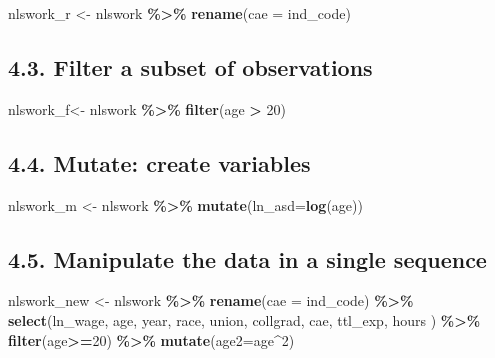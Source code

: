 \documentclass[
]{article}
\newenvironment{Shaded}{\begin{snugshade}}{\end{snugshade}}
\newcommand{\AttributeTok}[1]{\textcolor[rgb]{0.13,0.29,0.53}{#1}}
\newcommand{\DecValTok}[1]{\textcolor[rgb]{0.00,0.00,0.81}{#1}}
\newcommand{\FunctionTok}[1]{\textcolor[rgb]{0.13,0.29,0.53}{\textbf{#1}}}
\newcommand{\NormalTok}[1]{#1}
\newcommand{\OtherTok}[1]{\textcolor[rgb]{0.56,0.35,0.01}{#1}}
\newcommand{\SpecialCharTok}[1]{\textcolor[rgb]{0.81,0.36,0.00}{\textbf{#1}}}
\begin{document}
\begin{Shaded}
\begin{Highlighting}[]
\NormalTok{nlswork\_r }\OtherTok{\textless{}{-}}\NormalTok{ nlswork }\SpecialCharTok{\%\textgreater{}\%} 
  \FunctionTok{rename}\NormalTok{(}\AttributeTok{cae =}\NormalTok{ ind\_code)}
\end{Highlighting}
\end{Shaded}

\hypertarget{filter-a-subset-of-observations}{%
\subsection{4.3. Filter a subset of
observations}\label{filter-a-subset-of-observations}}

\begin{Shaded}
\begin{Highlighting}[]
\NormalTok{nlswork\_f}\OtherTok{\textless{}{-}}\NormalTok{ nlswork }\SpecialCharTok{\%\textgreater{}\%} 
  \FunctionTok{filter}\NormalTok{(age }\SpecialCharTok{\textgreater{}} \DecValTok{20}\NormalTok{) }
\end{Highlighting}
\end{Shaded}

\hypertarget{mutate-create-variables}{%
\subsection{4.4. Mutate: create
variables}\label{mutate-create-variables}}

\begin{Shaded}
\begin{Highlighting}[]
\NormalTok{ nlswork\_m }\OtherTok{\textless{}{-}}\NormalTok{ nlswork }\SpecialCharTok{\%\textgreater{}\%} 
  \FunctionTok{mutate}\NormalTok{(}\AttributeTok{ln\_asd=}\FunctionTok{log}\NormalTok{(age))}
\end{Highlighting}
\end{Shaded}

\hypertarget{manipulate-the-data-in-a-single-sequence}{%
\subsection{4.5. Manipulate the data in a single
sequence}\label{manipulate-the-data-in-a-single-sequence}}

\begin{Shaded}
\begin{Highlighting}[]
\NormalTok{nlswork\_new }\OtherTok{\textless{}{-}}\NormalTok{ nlswork }\SpecialCharTok{\%\textgreater{}\%} 
  \FunctionTok{rename}\NormalTok{(}\AttributeTok{cae =}\NormalTok{ ind\_code) }\SpecialCharTok{\%\textgreater{}\%}
  \FunctionTok{select}\NormalTok{(ln\_wage, age, year, race, union, collgrad, cae, ttl\_exp, hours ) }\SpecialCharTok{\%\textgreater{}\%} 
  \FunctionTok{filter}\NormalTok{(age}\SpecialCharTok{\textgreater{}=}\DecValTok{20}\NormalTok{) }\SpecialCharTok{\%\textgreater{}\%}
  \FunctionTok{mutate}\NormalTok{(}\AttributeTok{age2=}\NormalTok{age}\SpecialCharTok{\^{}}\DecValTok{2}\NormalTok{)}
\end{Highlighting}
\end{Shaded}
\end{document}
